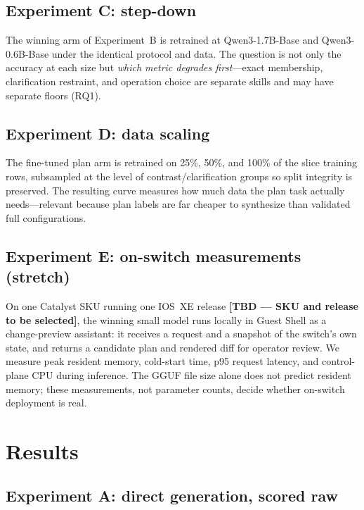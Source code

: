 \documentclass[conference]{IEEEtran}
\begin{document}
\subsection{Experiment C: step-down}
\label{sec:expc}

The winning arm of Experiment~B is retrained at Qwen3-1.7B-Base and Qwen3-0.6B-Base under the identical protocol and data. The question is not only the accuracy at each size but \emph{which metric degrades first}---exact membership, clarification restraint, and operation choice are separate skills and may have separate floors (RQ1).

\subsection{Experiment D: data scaling}
\label{sec:expd}

The fine-tuned plan arm is retrained on 25\%, 50\%, and 100\% of the slice training rows, subsampled at the level of contrast/clarification groups so split integrity is preserved. The resulting curve measures how much data the plan task actually needs---relevant because plan labels are far cheaper to synthesize than validated full configurations.

\subsection{Experiment E: on-switch measurements (stretch)}
\label{sec:expe}

On one Catalyst SKU running one IOS~XE release \textbf{[TBD --- SKU and release to be selected]}, the winning small model runs locally in Guest Shell as a change-preview assistant: it receives a request and a snapshot of the switch's own state, and returns a candidate plan and rendered diff for operator review. We measure peak resident memory, cold-start time, p95 request latency, and control-plane CPU during inference. The GGUF file size alone does not predict resident memory; these measurements, not parameter counts, decide whether on-switch deployment is real.

\section{Results}
\label{sec:results}

\subsection{Experiment A: direct generation, scored raw}
\label{sec:expa-results}
\end{document}
